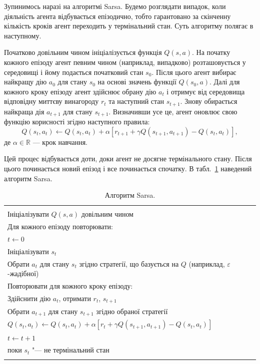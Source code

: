 \documentclass[a4paper,10pt,fleqn]{article}
\begin{document}
Зупинимось наразі на алгоритмі Sarsa. Будемо розглядати випадок, коли діяльність агента відбувається епізодично, тобто гарантовано за скінченну кількість кроків агент переходить у термінальний стан. Суть алгоритму полягає в наступному. 

Початково довільним чином ініціалізується функція $Q(s,a)$. На початку кожного епізоду агент певним чином (наприклад, випадково) розташовується у середовищі і йому подається початковий стан $s_0$. Після цього агент вибирає найкращу дію $a_0$ для стану $s_0$ на основі значень функції $Q(s_0,a)$. Далі для кожного кроку епізоду агент здійснює обрану дію $a_t$ і отримує від середовища відповідну миттєву винагороду $r_t$ та наступний стан $s_{t+1}$. Знову обирається найкраща дія $a_{t+1}$ для стану $s_{t+1}$. Визначивши усе це, агент оновлює свою функцію корисності згідно наступного правила:
\begin{equation} 
Q(s_t,a_t) \leftarrow Q(s_t,a_t) + \alpha\left[ r_{t+1} + \gamma Q(s_{t+1},a_{t+1}) - Q(s_t, a_t)\right],
\label{eq:sarsa-update-rule}
\end{equation}
де $\alpha \in \mathbb{R}$ --- крок навчання.

Цей процес відбувається доти, доки агент не досягне термінального стану. Після цього починається новий епізод і все починається спочатку. В табл.~\ref{table:Sarsa_algorithm} наведений алгоритм Sarsa.

\begin{table}
\centering
\begin{tabular}{|l|}
\hline\\
Ініціалізувати $Q(s,a)$ довільним чином\\
Для кожного епізоду повторювати:\\
\hspace{0.5cm} $t \leftarrow 0$\\
\hspace{0.5cm} Ініціалізувати $s_t$\\
\hspace{0.5cm} Обрати $a_t$ для стану $s_t$ згідно стратегії, що базується на $Q$ (наприклад, $\varepsilon$-жадібної)\\
\hspace{0.5cm} Повторювати для кожного кроку епізоду:\\
\hspace{1cm} 	Здійснити дію $a_t$, отримати $r_t$, $s_{t+1}$\\
\hspace{1cm} 	Обрати $a_{t+1}$ для стану $s_{t+1}$ згідно обраної стратегії\\
\hspace{1cm} 	$Q(s_t,a_t) \leftarrow Q(s_t,a_t) + \alpha\left[r_t + \gamma Q(s_{t+1},a_{t+1}) - Q(s_t,a_t)\right]$\\
\hspace{1cm} 	$t \leftarrow t + 1$\\
\hspace{0.5cm} поки $s_t$ "--- не термінальний стан\\
\\
\hline
\end{tabular}
\caption{Алгоритм Sarsa.}
\label{table:Sarsa_algorithm}
\end{table}
\end{document}
